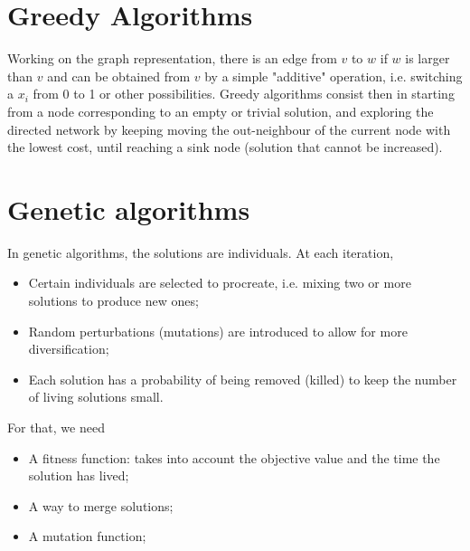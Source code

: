 \documentclass[11pt, openany]{report}
\theoremstyle{definition}
\begin{document}
\section{Greedy Algorithms}
Working on the graph representation, there is an edge from $v$ to $w$ if $w$ is larger than $v$ and can be obtained from $v$ by a simple "additive" operation, i.e. switching a $x_i$ from 0 to 1 or other possibilities. Greedy algorithms consist then in starting from a node corresponding to an empty or trivial solution, and exploring the directed network by keeping moving the out-neighbour of the current node with the lowest cost, until reaching a sink node (solution that cannot be increased). 
\section{Genetic algorithms}
In genetic algorithms, the solutions are individuals. At each iteration,
\begin{itemize}
    \item Certain individuals are selected to procreate, i.e. mixing two or more solutions to produce new ones;
    \item Random perturbations (mutations) are introduced to allow for more diversification;
    \item Each solution has a probability of being removed (killed) to keep the number of living solutions small. 
\end{itemize}
For that, we need 
\begin{itemize}
    \item A fitness function: takes into account the objective value and the time the solution has lived;
    \item A way to merge solutions;
    \item A mutation function;
\end{itemize}
\end{document}
